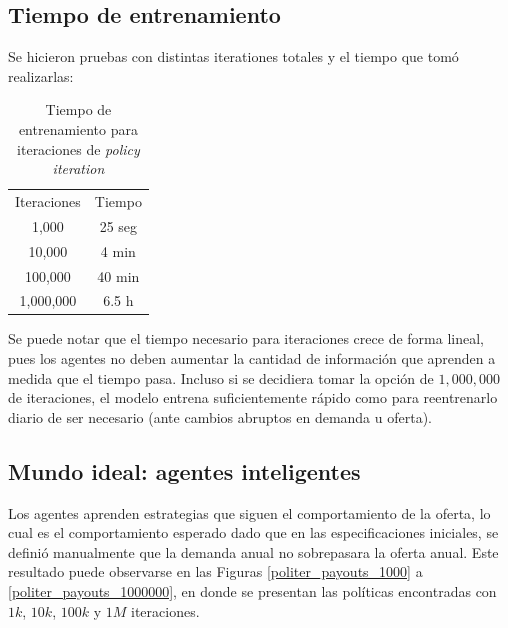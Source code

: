 \subsection{Tiempo de entrenamiento}

Se hicieron pruebas con distintas iterationes totales y el tiempo que tomó realizarlas:

\begin{table}
\caption{\label{tab:table-name}Tiempo de entrenamiento para iteraciones de \textit{policy iteration}}
\begin{center}
\begin{tabular}{c|c}
Iteraciones     &  Tiempo\\
1,000     &  25 seg\\
10,000     &  4 min\\
100,000     &  40 min\\
1,000,000     & 6.5 h
\end{tabular}
\end{center}
\end{table}


Se puede notar que el tiempo necesario para iteraciones crece de forma lineal, pues los agentes no deben aumentar la cantidad de informaci\'on que aprenden a medida que el tiempo pasa. Incluso si se decidiera tomar la opci\'on de $1,000,000$ de iteraciones, el modelo entrena suficientemente r\'apido como para reentrenarlo diario de ser necesario (ante cambios abruptos en demanda u oferta).

\subsection{Mundo ideal: agentes inteligentes}

Los agentes aprenden estrategias que siguen el comportamiento de la oferta, lo cual es el comportamiento esperado dado que en las especificaciones iniciales, se defini\'o manualmente que la demanda anual no sobrepasara la oferta anual. Este resultado puede observarse en las Figuras \ref{politer_payouts_1000} a \ref{politer_payouts_1000000}, en donde se presentan las pol\'iticas encontradas con $1k$, $10k$, $100k$ y $1M$ iteraciones. \\

